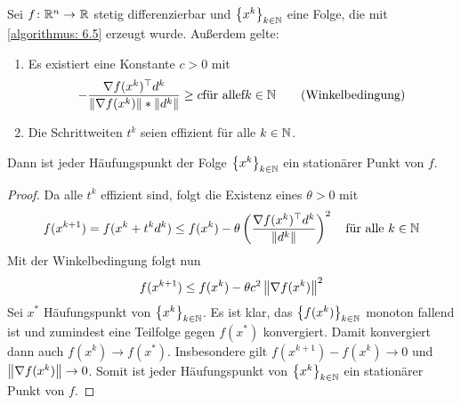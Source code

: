\begin{satz} \label{satz 6.7}
	Sei $\abb{f}{\R^n}{\R}$ stetig differenzierbar und $\folge[k \in \N]{x^k}$ eine Folge, die mit \cref{algorithmus: 6.5} erzeugt wurde. Außerdem gelte:
	\begin{enumerate}[label=\arabic*., nolistsep]
		\item Es existiert eine Konstante $c > 0$ mit 
		\begin{equation}
			- \frac{\trans{\nabla f(x^k)} d^k}{\norm{\nabla f(x^k)} * \norm{d^k}} \ge c \text{für allef} k \in \N \tag{\text{Winkelbedingung}}
		\end{equation}
		\item Die Schrittweiten $t^k$ seien effizient für alle $k \in \N$.
	\end{enumerate}
	Dann ist jeder Häufungspunkt der Folge $\folge[k \in \N]{x^k}$ ein stationärer Punkt von $f$.
\end{satz}
\begin{proof}
	Da alle $t^k$ effizient sind, folgt die Existenz eines $\theta > 0$ mit
	\begin{equation*}
		f(x^{k+1}) = f(x^k + t^k d^k) \le f(x^k) - \theta \left( \frac{\trans{\nabla f(x^k)} d^k}{\norm{d^k}} \right)^2 \quad \text{für alle } k \in \N
	\end{equation*}
	Mit der Winkelbedingung folgt nun
	\begin{equation*}
		f(x^{k+1}) \le f(x^k) - \theta c^2 \norm{\nabla f(x^k)}^2
	\end{equation*}
	Sei $x^\ast$ Häufungspunkt von $\folge[k \in \N]{x^k}$. Es ist klar, das $\folge[k \in \N]{f(x^k)}$ monoton fallend ist und zumindest eine Teilfolge gegen $f(x^\ast)$ konvergiert. Damit konvergiert dann auch $f(x^k) \to f(x^\ast)$. Insbesondere gilt $f(x^{k+1}) - f(x^k) \to 0$ und $\norm{\nabla f(x^k)} \to 0$. Somit ist jeder Häufungspunkt von $\folge[k \in \N]{x^k}$ ein stationärer Punkt von $f$.
\end{proof}


